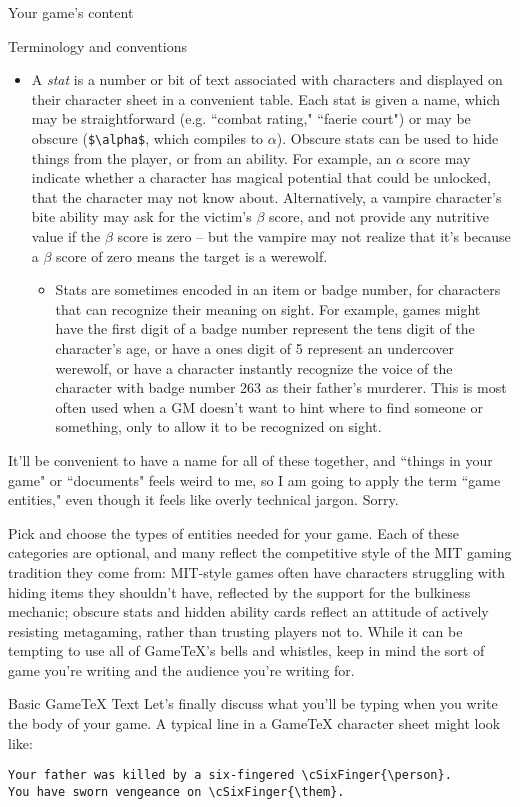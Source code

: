 \documentclass{article}
\newcommand{\gametex}{GameTeX}
\begin{document}
\begin{section}{Your game's content}
\begin{subsection}{Terminology and conventions}
\begin{itemize}
\begin{itemize}
\end{itemize}
  \item A \textit{stat} is a number or bit of text associated with characters and displayed on their character sheet in a convenient table.  Each stat is given a name, which may be straightforward (e.g. ``combat rating," ``faerie court") or may be obscure (\lstinline{$\alpha$}, which compiles to $\alpha$).  Obscure stats can be used to hide things from the player, or from an ability.  For example, an $\alpha$ score may indicate whether a character has magical potential that could be unlocked, that the character may not know about.  Alternatively, a vampire character's bite ability may ask for the victim's $\beta$ score, and not provide any nutritive value if the $\beta$ score is zero – but the vampire may not realize that it's because a $\beta$ score of zero means the target is a werewolf.
\begin{itemize}
\item Stats are sometimes encoded in an item or badge number, for characters that can recognize their meaning on sight.  For example, games might have the first digit of a badge number represent the tens digit of the character's age, or have a ones digit of 5 represent an undercover werewolf, or have a character instantly recognize the voice of the character with badge number 263 as their father's murderer.  This is most often used when a GM doesn't want to hint where to find someone or something, only to allow it to be recognized on sight.
\end{itemize}
\end{itemize}

It'll be convenient to have a name for all of these together, and ``things in your game" or ``documents" feels weird to me, so I am going to apply the term ``game entities," even though it feels like overly technical jargon.  Sorry.

Pick and choose the types of entities needed for your game.  Each of these categories are optional, and many reflect the competitive style of the MIT gaming tradition they come from: MIT-style games often have characters struggling with hiding items they shouldn't have, reflected by the support for the bulkiness mechanic; obscure stats and hidden ability cards reflect an attitude of actively resisting metagaming, rather than trusting players not to.  While it can be tempting to use all of \gametex{}'s bells and whistles, keep in mind the sort of game you're writing and the audience you're writing for.
\end{subsection}
\begin{subsection}{Basic \gametex{} Text}
Let's finally discuss what you'll be typing when you write the body of your game.
A typical line in a \gametex{} character sheet might look like:
\begin{verbatim}
Your father was killed by a six-fingered \cSixFinger{\person}.  
You have sworn vengeance on \cSixFinger{\them}.
\end{verbatim}


\end{subsection}
\end{section}
\end{document}
